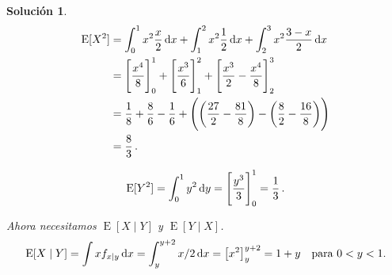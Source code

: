 \documentclass[
  a4paper,
  spanish,
  12pt,
]{scrartcl}
\theoremstyle{ejercicio-style}
\theoremstyle{remark-style}
\newtheorem*{sol}{Solución}
\begin{document}
\begin{sol}
  \begin{align*}
    \operatorname{E}[X^2] &= \int_0^1 x^2\frac{x}{2}\dif x
       + \int_1^2 x^2\frac{1}{2} \dif x
       + \int_2^3 x^2\frac{3-x}{2} \dif x\\
      &= \left[\frac{x^4}{8}\right]^1_0
       + \left[\frac{x^3}{6}\right]^2_1
       + \left[\frac{x^3}{2} - \frac{x^4}{8}\right]^3_2\\
      &= \frac{1}{8} + \frac{8}{6} - \frac{1}{6} + \left(
        \left(\frac{27}{2} - \frac{81}{8}\right) - \left(\frac{8}{2} - \frac{16}{8}\right)
      \right)\\
      &= \frac{8}{3}\,.
  \end{align*}

  \begin{align*}
    \operatorname{E}[Y^2] = \int_0^1 y^2\dif y
       = \left[\frac{y^3}{3}\right]^1_0
       = \frac{1}{3}\,.
  \end{align*}

  Ahora necesitamos \(\operatorname{E}[X \mid Y]\) y \(\operatorname{E}[Y \mid X]\).
  \begin{align*}
    \operatorname{E}[X \mid Y] = \int x f_{x\mid y} \dif x = \int_{y}^{y+2} x/2 \dif x = \big[x^2\big]^{y+2}_y = 1 +y \quad \text{para } 0 < y < 1. 
  \end{align*}
\end{sol}
\end{document}
